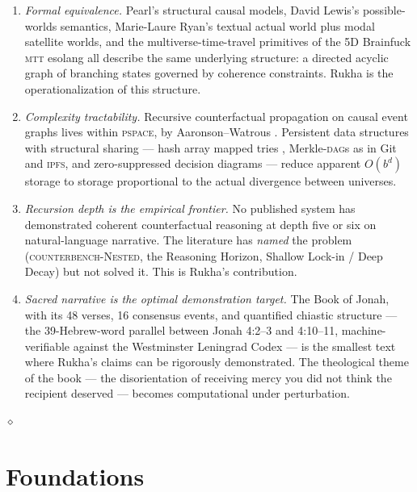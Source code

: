 \documentclass[11pt]{article}
\theoremstyle{rukha}
\newcommand{\diamondrule}{%
  \begin{center}\vspace{0.6em}%
  {\scriptsize $\diamond$}\vspace{0.6em}\end{center}}
\begin{document}
\begin{enumerate}
  \item \emph{Formal equivalence.} Pearl's structural causal models,
    David Lewis's possible-worlds semantics, Marie-Laure Ryan's textual
    actual world plus modal satellite worlds, and the multiverse-time-travel
    primitives of the 5D Brainfuck \textsc{mtt} esolang all describe the
    same underlying structure: a directed acyclic graph of branching
    states governed by coherence constraints. Rukha is the operationalization
    of this structure.

  \item \emph{Complexity tractability.} Recursive counterfactual
    propagation on causal event graphs lives within \textsc{pspace}, by
    Aaronson–Watrous \cite{aaronsonwatrous}. Persistent data structures
    with structural sharing --- hash array mapped tries
    \cite{bagwellhamt}, Merkle-\textsc{dag}s as in Git and \textsc{ipfs},
    and zero-suppressed decision diagrams \cite{knuthzdd} --- reduce
    apparent $O(b^d)$ storage to storage proportional to the actual
    divergence between universes.

  \item \emph{Recursion depth is the empirical frontier.} No published
    system has demonstrated coherent counterfactual reasoning at depth
    five or six on natural-language narrative. The literature has
    \emph{named} the problem (\textsc{counterbench-Nested}, the Reasoning
    Horizon, Shallow Lock-in / Deep Decay) but not solved it. This is
    Rukha's contribution.

  \item \emph{Sacred narrative is the optimal demonstration target.}
    The Book of Jonah, with its 48 verses, 16 consensus events, and
    quantified chiastic structure --- the 39-Hebrew-word parallel between
    Jonah 4:2–3 and 4:10–11, machine-verifiable against the Westminster
    Leningrad Codex --- is the smallest text where Rukha's claims can be
    rigorously demonstrated. The theological theme of the book ---
    the disorientation of receiving mercy you did not think the
    recipient deserved --- becomes computational under perturbation.
\end{enumerate}

\diamondrule

\section{Foundations}
\end{document}
